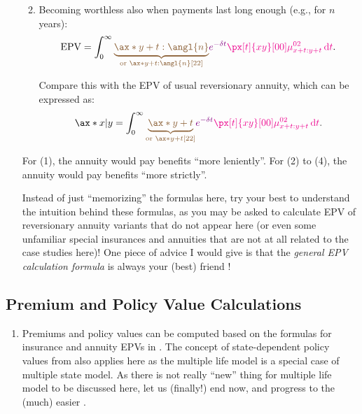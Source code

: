 \begin{enumerate}
\begin{enumerate}[label={(\arabic*)}]
\[\]
\item Becoming worthless also when payments last long enough (e.g., for \(n\) years):
\[
\text{EPV}=\int_{0}^{\infty}\brc{\underbrace{\ax*{y+t:\angl{n}}}_{\text{or }\ax*{y+t:\angl{n}}[22]}
}\vc{e^{-\delta t}}\mgc{\px[t]{xy}[00]\mu_{x+t:y+t}^{02}\dd{t}}.
\]
\begin{note}
Compare this with the EPV of usual reversionary annuity, which can be expressed
as:
\[
\ax*{x|y}=\int_{0}^{\infty}\brc{\underbrace{\ax*{y+t}}_{\text{or }\ax*{y+t}[22]}
}\vc{e^{-\delta t}}\mgc{\px[t]{xy}[00]\mu_{x+t:y+t}^{02}\dd{t}}.
\]
\end{note}

\end{enumerate}
For (1), the annuity would pay benefits ``more leniently''. For (2) to (4), the
annuity would pay benefits ``more strictly''.

\begin{warning}
Instead of just ``memorizing'' the formulas here, try your best to understand
the intuition behind these formulas, as you may be asked to calculate EPV of
reversionary annuity variants that do not appear here (or even some unfamiliar
special insurances and annuities that are not at all related to the case
studies here)! One piece of advice I would give is that the \emph{general EPV
calculation formula} is always your (best) friend !
\end{warning}
\end{enumerate}
\subsection{Premium and Policy Value Calculations}
\begin{enumerate}
\item Premiums and policy values can be computed based on the formulas for
insurance and annuity EPVs in .  The
concept of state-dependent policy values from 
also applies here as the multiple life model is a special case of multiple
state model. As there is not really ``new'' thing for multiple life model to be
discussed here, let us (finally!) end  now, and
progress to the (much) easier 
.
\end{enumerate}

